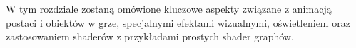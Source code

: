 W tym rozdziale zostaną omówione kluczowe aspekty związane z animacją postaci i obiektów w grze, specjalnymi efektami wizualnymi, oświetleniem oraz zastosowaniem shaderów z przykładami prostych shader graphów.